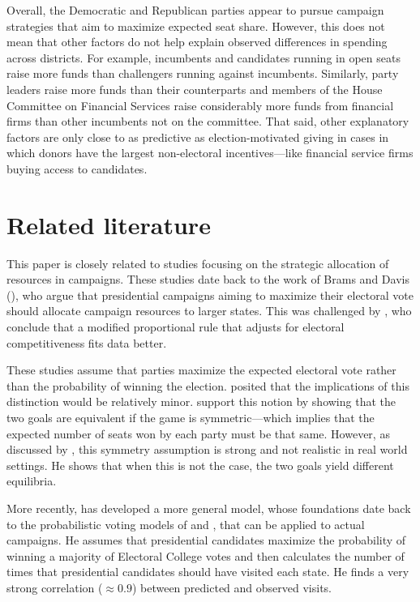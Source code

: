 \documentclass[12pt,final,fleqn]{article}
\theoremstyle{plain}
\begin{document}
Overall, the Democratic and Republican parties appear to pursue campaign strategies that aim to maximize expected seat share. However, this does not mean that other factors do not help explain observed differences in spending across districts. For example, incumbents and candidates running in open seats raise more funds than challengers running against incumbents. Similarly, party leaders raise more funds than their counterparts and members of the House Committee on Financial Services raise considerably more funds from financial firms than other incumbents not on the committee. That said, other explanatory factors are only close to as predictive as election-motivated giving in cases in which donors have the largest non-electoral incentives---like financial service firms buying access to candidates.

\section{Related literature}

This paper is closely related to studies focusing on the strategic allocation of resources in campaigns. These studies date back to the work of Brams and Davis (\citeyear{brams1973resource, brams19743}), who argue that presidential campaigns aiming to maximize their electoral vote should allocate campaign resources to larger states. This was challenged by \citet{colantoni1975campaign}, who conclude that a modified proportional rule that adjusts for electoral competitiveness fits data better.

These studies assume that parties maximize the expected electoral vote rather than the probability of winning the election. \citet{brams1973resource} posited that the implications of this distinction would be relatively minor. \citet{aranson1974election} support this notion by showing that the two goals are equivalent if the game is symmetric---which implies that the expected number of seats won by each party must be that same. However, as discussed by \citet{snyder1989election}, this symmetry assumption is strong and not realistic in real world settings. He shows that when this is not the case, the two goals yield different equilibria.

More recently, \citet{stromberg2008electoral} has developed a more general model, whose foundations date back to the probabilistic voting models of \citet{lindbeck1987balanced} and \citet{dixit1996determinants}, that can be applied to actual campaigns. He assumes that presidential candidates maximize the probability of winning a majority of Electoral College votes and then calculates the number of times that presidential candidates should have visited each state. He finds a very strong correlation ($ \approx 0.9$) between predicted and observed visits. 
\end{document}

